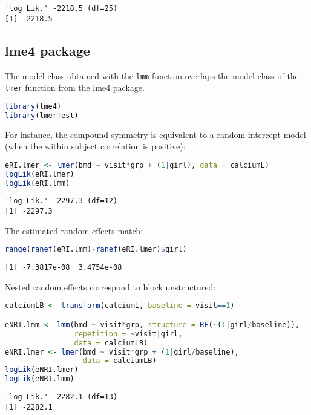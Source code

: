\documentclass[12pt]{article}
\begin{document}
\label{}
\begin{verbatim}
'log Lik.' -2218.5 (df=25)
[1] -2218.5
\end{verbatim}


\clearpage
\subsection{lme4 package}
\label{sec:org4a480f1}

The model class obtained with the \texttt{lmm} function overlaps the model
class of the \texttt{lmer} function from the lme4 package.
\begin{lstlisting}[language=r,numbers=none]
library(lme4)
library(lmerTest)
\end{lstlisting}

For instance, the compound symmetry is equivalent to a random
intercept model (when the within subject correlation is positive):
\begin{lstlisting}[language=r,numbers=none]
eRI.lmer <- lmer(bmd ~ visit*grp + (1|girl), data = calciumL)
logLik(eRI.lmer)
logLik(eRI.lmm)
\end{lstlisting}

\label{}
\begin{verbatim}
'log Lik.' -2297.3 (df=12)
[1] -2297.3
\end{verbatim}


The estimated random effects match:
\begin{lstlisting}[language=r,numbers=none]
range(ranef(eRI.lmm)-ranef(eRI.lmer)$girl)
\end{lstlisting}

\label{}
\begin{verbatim}
[1] -7.3817e-08  3.4754e-08
\end{verbatim}


Nested random effects correspond to block unstructured:
\begin{lstlisting}[language=r,numbers=none]
calciumLB <- transform(calciumL, baseline = visit==1)

eNRI.lmm <- lmm(bmd ~ visit*grp, structure = RE(~(1|girl/baseline)),
                repetition = ~visit|girl,
                data = calciumLB)
eNRI.lmer <- lmer(bmd ~ visit*grp + (1|girl/baseline),
                  data = calciumLB)
logLik(eNRI.lmer)
logLik(eNRI.lmm)
\end{lstlisting}

\label{}
\begin{verbatim}
'log Lik.' -2282.1 (df=13)
[1] -2282.1
\end{verbatim}
\end{document}
